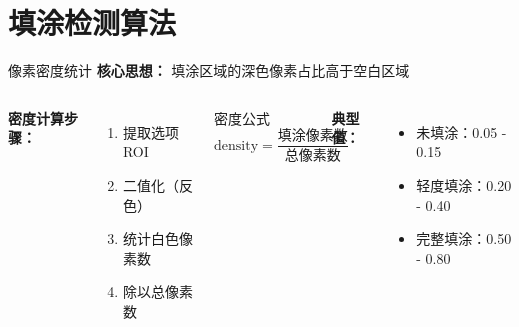 \section{填涂检测算法}

\begin{frame}{像素密度统计}
    \textbf{核心思想：} 填涂区域的深色像素占比高于空白区域

    \vspace{0.3cm}

    \begin{columns}
        \textbf{密度计算步骤：}
        \begin{enumerate}
            \item 提取选项ROI
            \item 二值化（反色）
            \item 统计白色像素数
            \item 除以总像素数
        \end{enumerate}

        \begin{block}{密度公式}
        \[ \text{density} = \frac{\text{填涂像素数}}{\text{总像素数}} \]
        \end{block}

        \textbf{典型值：}
        \begin{itemize}
            \item 未填涂：0.05 - 0.15
            \item 轻度填涂：0.20 - 0.40
            \item 完整填涂：0.50 - 0.80
        \end{itemize}
    \end{columns}
\end{frame}

